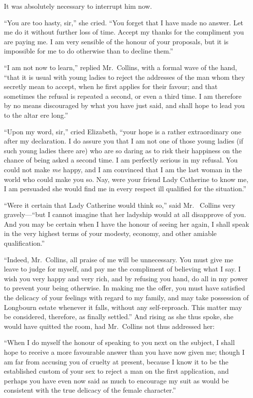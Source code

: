 It was absolutely necessary to interrupt him now.

``You are too hasty, sir,'' she cried.  ``You forget that I have
made no answer.  Let me do it without further loss of time.
Accept my thanks for the compliment you are paying me.  I am
very sensible of the honour of your proposals, but it is
impossible for me to do otherwise than to decline them.''

``I am not now to learn,'' replied Mr.\ Collins, with a formal wave
of the hand, ``that it is usual with young ladies to reject the
addresses of the man whom they secretly mean to accept, when
he first applies for their favour; and that sometimes the refusal
is repeated a second, or even a third time.  I am therefore by no
means discouraged by what you have just said, and shall hope to
lead you to the altar ere long.''

``Upon my word, sir,'' cried Elizabeth, ``your hope is a rather
extraordinary one after my declaration.  I do assure you that I
am not one of those young ladies (if such young ladies there are)
who are so daring as to risk their happiness on the chance of
being asked a second time.  I am perfectly serious in my refusal.
You could not make \emph{me} happy, and I am convinced that I am
the last woman in the world who could make you so.  Nay, were
your friend Lady Catherine to know me, I am persuaded she
would find me in every respect ill qualified for the situation.''

``Were it certain that Lady Catherine would think so,'' said Mr.\ %
Collins very gravely---``but I cannot imagine that her ladyship
would at all disapprove of you.  And you may be certain when I
have the honour of seeing her again, I shall speak in the very
highest terms of your modesty, economy, and other amiable
qualification.''

``Indeed, Mr.\ Collins, all praise of me will be unnecessary.
You must give me leave to judge for myself, and pay me the
compliment of believing what I say.  I wish you very happy and
very rich, and by refusing you hand, do all in my power to
prevent your being otherwise.  In making me the offer, you must
have satisfied the delicacy of your feelings with regard to my
family, and may take possession of Longbourn estate whenever
it falls, without any self-reproach.  This matter may be
considered, therefore, as finally settled.''  And rising as she
thus spoke, she would have quitted the room, had Mr.\ Collins
not thus addressed her:

``When I do myself the honour of speaking to you next on the
subject, I shall hope to receive a more favourable answer than
you have now given me; though I am far from accusing you of
cruelty at present, because I know it to be the established
custom of your sex to reject a man on the first application, and
perhaps you have even now said as much to encourage my suit
as would be consistent with the true delicacy of the female
character.''

